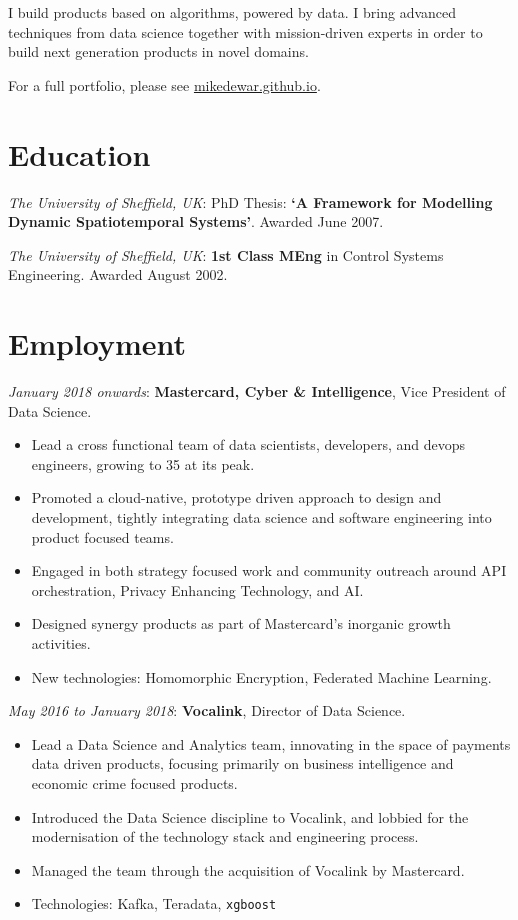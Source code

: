 \documentclass[line, overlapped]{res}
\providecommand{\tightlist}{%
  \setlength{\itemsep}{0pt}\setlength{\parskip}{0pt}}
\begin{document}

\address{
London\\
mikedewar@gmail.com
}

\begin{resume}

I build products based on algorithms, powered by data. I bring advanced
techniques from data science together with mission-driven experts in
order to build next generation products in novel domains.

For a full portfolio, please see \href{https://mikedewar.github.io}{mikedewar.github.io}.

\section{Education}

\emph{The University of Sheffield, UK}: PhD Thesis: \textbf{`A
  Framework for Modelling Dynamic Spatiotemporal Systems'}. Awarded June
  2007. 

\emph{The University of Sheffield, UK}: \textbf{1st Class MEng} in
  Control Systems Engineering. Awarded August 2002.

\section{Employment}

  \emph{January 2018 onwards}: \textbf{Mastercard, Cyber \&
  Intelligence}, Vice President of Data Science.
  \begin{itemize}
  \tightlist
	\item Lead a cross functional team of data scientists, developers, and devops engineers, growing to 35 at its peak.
	\item Promoted a cloud-native, prototype driven approach to design and development, tightly integrating data science and software engineering into product focused teams.
	\item Engaged in both strategy focused work and community outreach around API orchestration, Privacy Enhancing Technology, and AI.
	\item Designed synergy products as part of Mastercard's inorganic growth activities.
	\item New technologies: Homomorphic Encryption, Federated Machine Learning.
  \end{itemize}

  \emph{May 2016 to January 2018}: \textbf{Vocalink}, Director of Data Science.
  \begin{itemize}
  \tightlist
	\item Lead a Data Science and Analytics team, innovating in the space of payments data driven products, focusing primarily on business intelligence and economic crime focused products.
	\item Introduced the Data Science discipline to Vocalink, and lobbied for the modernisation of the technology stack and engineering process.
	\item Managed the team through the acquisition of Vocalink by Mastercard.
	\item Technologies: Kafka, Teradata, \texttt{xgboost}
  \end{itemize}


\end{resume}
\end{document}
